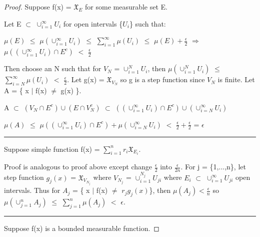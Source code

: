     \begin{proof}
        Suppose f(x) = $\mathfrak{X}_{E}$ for some measurable set E.

        Let E $\subset$ $\cup_{i=1}^{\infty} U_i$ for open intervals
        \{$U_i$\} such that:

        \hspace{0.5cm}
        $\mu(E)$
        $\leq$ $\mu(\cup_{i=1}^{\infty} U_i)$
        $\leq$ $\sum_{i=1}^{\infty} \mu(U_i)$
        $\leq$ $\mu(E) + \frac{\epsilon}{2}$
        \hspace{0.5cm}
        $\Rightarrow$
        \hspace{0.5cm}
        $\mu((\cup_{i=1}^{\infty} U_i) \cap E^c)$ $<$ $\frac{\epsilon}{2}$

        Then choose an N such that for $V_N$ = $\cup_{i=1}^N U_i$,
        then $\mu(\cup_{i=1}^N U_i)$ $\leq$ $\sum_{i=N}^{\infty} \mu(U_i)$
        $<$ $\frac{\epsilon}{2}$.
        Let g(x) = $\mathfrak{X}_{V_N}$ so g is a step function since $V_N$
        is finite.
        Let A = \{ x $|$ f(x) $\not =$ g(x) \}.

        \hspace{0.5cm}
        A $\subset$ $(V_N \cap E^c) \cup (E \cap V_N^c)$
        $\subset$ $((\cup_{i=1}^{\infty} U_i) \cap E^c)
                    \cup (\cup_{i=N}^{\infty} U_i)$

        \hspace{0.5cm}
        $\mu(A)$ $\leq$ $\mu((\cup_{i=1}^{\infty} U_i) \cap E^c)
                        + \mu(\cup_{i=N}^{\infty} U_i)$
        $<$ $\frac{\epsilon}{2} + \frac{\epsilon}{2}$
        = $\epsilon$

        \rule[0.1cm]{16.7cm}{0.01cm}

        Suppose simple function f(x) = $\sum_{i=1}^n r_i \mathfrak{X}_{E_i}$.

        Proof is analogous to proof above except change $\frac{\epsilon}{2}$
        into $\frac{\epsilon}{2n}$.
        For j = \{1,...,n\}, let step function
        $g_j(x)$ = $\mathfrak{X}_{V_{N_j}}$
        where $V_{N_j}$ = $\cup_{i=1}^{N_j} U_{ji}$ where $E_i$ $\subset$
        $\cup_{i=1}^{\infty} U_{ji}$ open intervals.
        Thus for $A_j$ = \{ x $|$ f(x) $\not =$ $r_j g_j(x)$\},
        then $\mu(A_j) < \frac{\epsilon}{n}$
        so $\mu(\cup_{j=1}^n A_j)$
        $\leq$ $\sum_{j=1}^n \mu(A_j)$
        $<$ $\epsilon$.

        \rule[0.1cm]{16.7cm}{0.01cm}

        Suppose f(x) is a bounded measurable function.


\end{proof}
